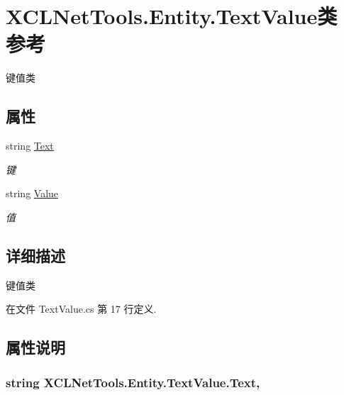 \hypertarget{class_x_c_l_net_tools_1_1_entity_1_1_text_value}{\section{X\-C\-L\-Net\-Tools.\-Entity.\-Text\-Value类 参考}
\label{class_x_c_l_net_tools_1_1_entity_1_1_text_value}
}


键值类  


\subsection*{属性}
\begin{DoxyCompactItemize}
\item 
string \hyperlink{class_x_c_l_net_tools_1_1_entity_1_1_text_value_a56860ac04aa98fbb3e41e5b451d16c4a}{Text}
\begin{DoxyCompactList}\small\item\em 键 \end{DoxyCompactList}\item 
string \hyperlink{class_x_c_l_net_tools_1_1_entity_1_1_text_value_a8a193486b942adc898433bd29db3eff7}{Value}
\begin{DoxyCompactList}\small\item\em 值 \end{DoxyCompactList}\end{DoxyCompactItemize}


\subsection{详细描述}
键值类 



在文件 Text\-Value.\-cs 第 17 行定义.



\subsection{属性说明}
\hypertarget{class_x_c_l_net_tools_1_1_entity_1_1_text_value_a56860ac04aa98fbb3e41e5b451d16c4a}{
\subsubsection[{Text}]{\setlength{\rightskip}{0pt plus 5cm}string X\-C\-L\-Net\-Tools.\-Entity.\-Text\-Value.\-Text\hspace{0.3cm}{\ttfamily [get]}, {\ttfamily [set]}}}\label{class_x_c_l_net_tools_1_1_entity_1_1_text_value_a56860ac04aa98fbb3e41e5b451d16c4a}


